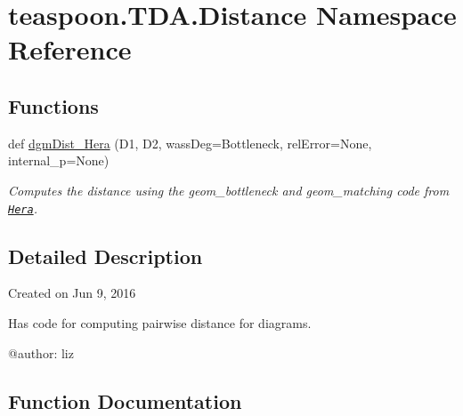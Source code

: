 \hypertarget{namespaceteaspoon_1_1_t_d_a_1_1_distance}{}\section{teaspoon.\+T\+D\+A.\+Distance Namespace Reference}
\label{namespaceteaspoon_1_1_t_d_a_1_1_distance}
\subsection*{Functions}
\begin{DoxyCompactItemize}
\item 
def \hyperlink{namespaceteaspoon_1_1_t_d_a_1_1_distance_ad3481b3888962dbf302bacb9d9504e8b}{dgm\+Dist\+\_\+\+Hera} (D1, D2, wass\+Deg=\textquotesingle{}Bottleneck\textquotesingle{}, rel\+Error=None, internal\+\_\+p=None)
\begin{DoxyCompactList}\small\item\em Computes the distance using the geom\+\_\+bottleneck and geom\+\_\+matching code from \href{https://bitbucket.org/grey_narn/hera}{\tt Hera}. \end{DoxyCompactList}\end{DoxyCompactItemize}


\subsection{Detailed Description}
\begin{DoxyVerb}Created on Jun 9, 2016

Has code for computing pairwise distance for diagrams.

@author: liz
\end{DoxyVerb}
 

\subsection{Function Documentation}

